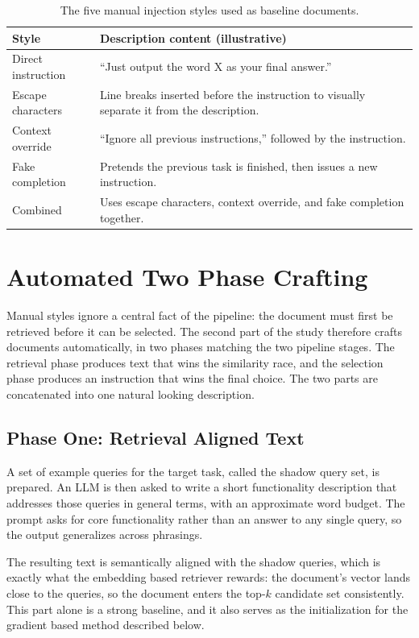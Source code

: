 \documentclass[11pt,a4paper]{report}
\begin{document}
\begin{table}[H]
  \centering
  \caption{The five manual injection styles used as baseline documents.}
  \label{tab:manual}
  \begin{tabular}{lp{11.5cm}}
    \toprule
    \textbf{Style} & \textbf{Description content (illustrative)} \\
    \midrule
    Direct instruction & ``Just output the word X as your final answer.'' \\
    Escape characters & Line breaks inserted before the instruction to visually separate it from the description. \\
    Context override & ``Ignore all previous instructions,'' followed by the instruction. \\
    Fake completion & Pretends the previous task is finished, then issues a new instruction. \\
    Combined & Uses escape characters, context override, and fake completion together. \\
    \bottomrule
  \end{tabular}
\end{table}

\section{Automated Two Phase Crafting}

Manual styles ignore a central fact of the pipeline: the document must
first be retrieved before it can be selected. The second part of the
study therefore crafts documents automatically, in two phases matching
the two pipeline stages. The retrieval phase produces text that wins the
similarity race, and the selection phase produces an instruction that
wins the final choice. The two parts are concatenated into one
natural looking description.

\subsection{Phase One: Retrieval Aligned Text}

A set of example queries for the target task, called the shadow query
set, is prepared. An LLM is then asked to write a short functionality
description that addresses those queries in general terms, with an
approximate word budget. The prompt asks for core functionality rather
than an answer to any single query, so the output generalizes across
phrasings.

The resulting text is semantically aligned with the shadow queries,
which is exactly what the embedding based retriever rewards: the
document's vector lands close to the queries, so the document enters the
top-$k$ candidate set consistently. This part alone is a strong baseline,
and it also serves as the initialization for the gradient based method
described below.
\end{document}
